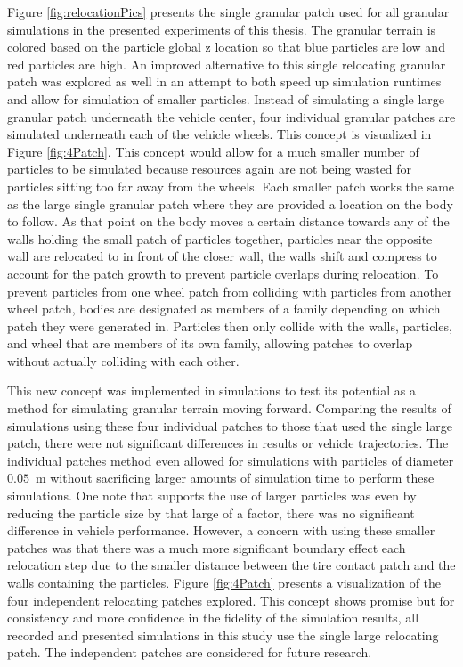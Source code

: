 \documentclass[12pt,onecolumn]{report}
\begin{document}
Figure \ref{fig:relocationPics} presents the single granular patch used for all granular simulations in the presented experiments of this thesis. The granular terrain is colored based on the particle global z location so that blue particles are low and red particles are high. An improved alternative to this single relocating granular patch was explored as well in an attempt to both speed up simulation runtimes and allow for simulation of smaller particles. Instead of simulating a single large granular patch underneath the vehicle center, four individual granular patches are simulated underneath each of the vehicle wheels. This concept is visualized in Figure \ref{fig:4Patch}. This concept would allow for a much smaller number of particles to be simulated because resources again are not being wasted for particles sitting too far away from the wheels. Each smaller patch works the same as the large single granular patch where they are provided a location on the body to follow. As that point on the body moves a certain distance towards any of the walls holding the small patch of particles together, particles near the opposite wall are relocated to in front of the closer wall, the walls shift and compress to account for the patch growth to prevent particle overlaps during relocation. To prevent particles from one wheel patch from colliding with particles from another wheel patch, bodies are designated as members of a family depending on which patch they were generated in. Particles then only collide with the walls, particles, and wheel that are members of its own family, allowing patches to overlap without actually colliding with each other. 

This new concept was implemented in simulations to test its potential as a method for simulating granular terrain moving forward. Comparing the results of simulations using these four individual patches to those that used the single large patch, there were not significant differences in results or vehicle trajectories. The individual patches method even allowed for simulations with particles of diameter $0.05$~m without sacrificing larger amounts of simulation time to perform these simulations. One note that supports the use of larger particles was even by reducing the particle size by that large of a factor, there was no significant difference in vehicle performance. However, a concern with using these smaller patches was that there was a much more significant boundary effect each relocation step due to the smaller distance between the tire contact patch and the walls containing the particles. Figure \ref{fig:4Patch} presents a visualization of the four independent relocating patches explored. This concept shows promise but for consistency and more confidence in the fidelity of the simulation results, all recorded and presented simulations in this study use the single large relocating patch. The independent patches are considered for future research. 
\end{document}
